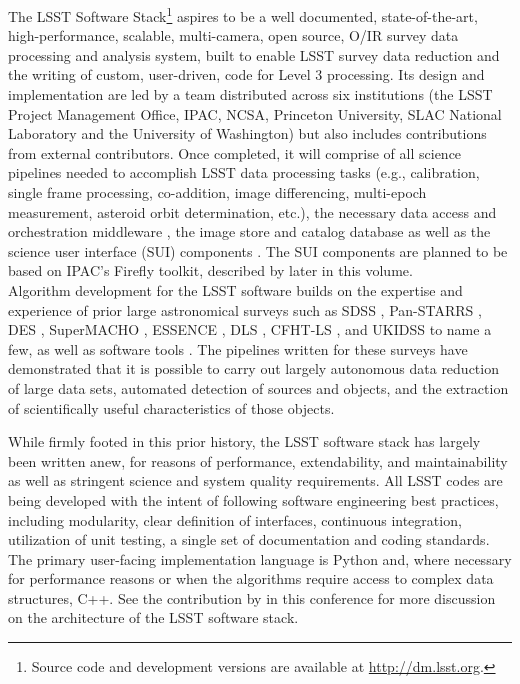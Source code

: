 \documentclass[11pt,twoside]{article}
\begin{document}
The LSST Software Stack\footnote{Source code and development versions are available at
\url{http://dm.lsst.org}.} aspires to be a well documented, state-of-the-art,
high-performance, scalable, multi-camera, open source, O/IR survey
data processing and analysis system, built to enable LSST survey data
reduction and the writing of custom, user-driven, code for Level 3
processing. Its design and implementation are led by a team distributed
across six institutions (the LSST Project Management Office, IPAC, NCSA,
Princeton University, SLAC National Laboratory and the University
of Washington) but also includes contributions from external contributors.
Once completed, it will comprise of
all science pipelines \citep{LDM-151, LDM-156} needed to accomplish LSST data processing tasks
(e.g., calibration, single frame processing, co-addition, image
differencing, multi-epoch measurement, asteroid orbit determination,
etc.), the necessary data
access and orchestration middleware \citep{LDM-152}, the
image store and catalog database \citep{LDM-135,Wang:2011:QDS:2063348.2063364}
as well as the science user interface (SUI) components \citep{LDM-131}.
The SUI components are planned to be based on IPAC's Firefly toolkit,
described by \citet{O10-1_adassxxv} later in this volume.
\\

Algorithm development for the LSST software builds on the expertise
and experience of prior large astronomical surveys such as
SDSS \citep{2000AJ....120.1579Y},
Pan-STARRS \citep{2006amos.confE..50M,2010SPIE.7733E..0EK},
DES \citep{DESDM},
SuperMACHO \citep{2005IAUS..225..357B},
ESSENCE \citep{2007ApJ...666..674M},
DLS \citep{2002SPIE.4836...73W},
CFHT-LS \citep{2012MNRAS.427..146H, 2013MNRAS.429.2858M, 2012AJ....143...38G},
and UKIDSS \citep{2007MNRAS.379.1599L}
to name a few, as well as software tools
\citep[e.g., SExtractor,][ascl:1010.064]{1996A&AS..117..393B}.
The pipelines written for these surveys have demonstrated that it is
possible to carry out largely autonomous data reduction of large data
sets, automated detection of sources and objects, and the
extraction of scientifically useful characteristics of those objects.

While firmly footed in this prior history, the LSST software stack has
largely been written anew, for reasons of performance, extendability, and
maintainability as well as stringent science and system quality requirements.
All LSST codes are being developed with the intent of
following software engineering best practices, including modularity, clear definition
of interfaces, continuous integration,
utilization of unit testing, a single set of documentation and coding
standards. The primary user-facing implementation language is Python and, where
necessary for performance reasons or when the algorithms require access to complex data structures, C++.
See the contribution by \citet{P056_adassxxv} in this conference for
more discussion on the architecture of the LSST software stack.
\\
\end{document}
